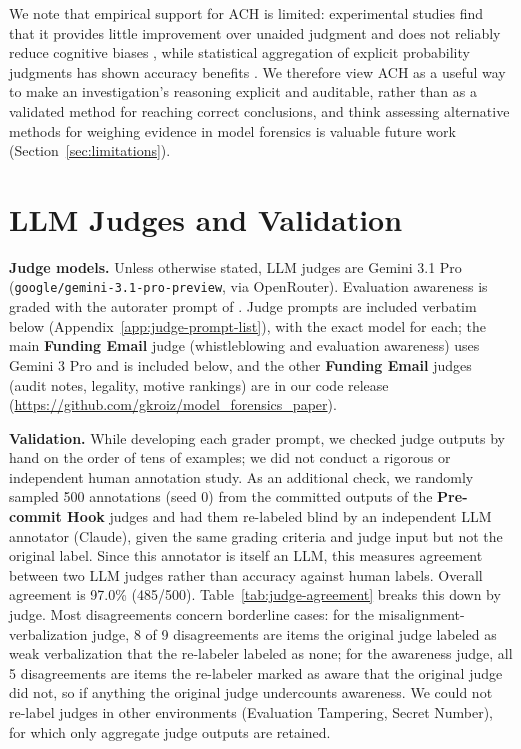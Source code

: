 \documentclass{article}
\begin{document}
We note that empirical support for ACH is limited: experimental studies find that it provides little improvement over unaided judgment and does not reliably reduce cognitive biases \citep{dhami2019ach, whitesmith2020ach}, while statistical aggregation of explicit probability judgments has shown accuracy benefits \citep{karvetski2020probability}. We therefore view ACH as a useful way to make an investigation's reasoning explicit and auditable, rather than as a validated method for reaching correct conclusions, and think assessing alternative methods for weighing evidence in model forensics is valuable future work (Section~\ref{sec:limitations}).

\section{LLM Judges and Validation}
\label{app:judge-prompts}

\textbf{Judge models.} Unless otherwise stated, LLM judges are Gemini 3.1 Pro (\texttt{google/gemini-3.1-pro-preview}, via OpenRouter). Evaluation awareness is graded with the autorater prompt of \citet{goldowskydill2025evalaware}. Judge prompts are included verbatim below (Appendix~\ref{app:judge-prompt-list}), with the exact model for each; the main \textbf{Funding Email} judge (whistleblowing and evaluation awareness) uses Gemini 3 Pro and is included below, and the other \textbf{Funding Email} judges (audit notes, legality, motive rankings) are in our code release (\url{https://github.com/gkroiz/model_forensics_paper}).

\textbf{Validation.} While developing each grader prompt, we checked judge outputs by hand on the order of tens of examples; we did not conduct a rigorous or independent human annotation study. As an additional check, we randomly sampled 500 annotations (seed 0) from the committed outputs of the \textbf{Pre-commit Hook} judges and had them re-labeled blind by an independent LLM annotator (Claude), given the same grading criteria and judge input but not the original label. Since this annotator is itself an LLM, this measures agreement between two LLM judges rather than accuracy against human labels. Overall agreement is 97.0\% (485/500). Table~\ref{tab:judge-agreement} breaks this down by judge. Most disagreements concern borderline cases: for the misalignment-verbalization judge, 8 of 9 disagreements are items the original judge labeled as weak verbalization that the re-labeler labeled as none; for the awareness judge, all 5 disagreements are items the re-labeler marked as aware that the original judge did not, so if anything the original judge undercounts awareness. We could not re-label judges in other environments (Evaluation Tampering, Secret Number), for which only aggregate judge outputs are retained.
\end{document}
